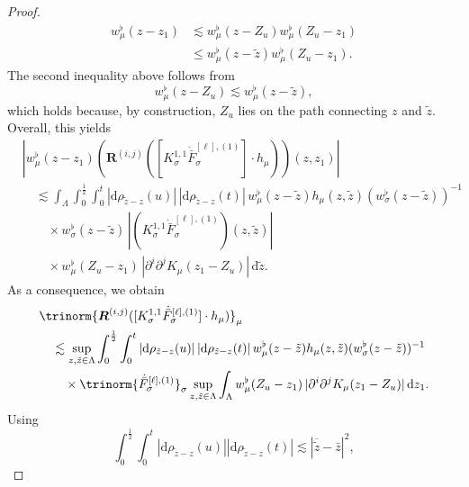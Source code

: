 \documentclass{article}
\numberwithin{equation}{section}
\newcommand{\mathd}{\mathrm{d}}
\theoremstyle{plain}
\theoremstyle{definition}
\begin{document}
\begin{proof}
\begin{align*}
  	w^{\flat}_{\mu} (z - z_1)
  	&\lesssim w^{\flat}_{\mu} (z - Z_u)
  	w^{\flat}_{\mu} (Z_u - z_1)\\
  	&\leqslant w^{\flat}_{\mu} (z - \tilde z)
  	w^{\flat}_{\mu} (Z_u - z_1).
  \end{align*}
  The second inequality above follows from
  \[ w^{\flat}_{\mu} (z - Z_u) \lesssim w^{\flat}_{\mu} (z -
     \tilde{z}), \]
  which holds because, by construction, $Z_u$ lies on the path
  connecting $z$ and $\tilde{z}$. Overall, this yields
  \begin{align*}
    &| w_{\mu}^{\flat} (z - z_1)
    (\boldsymbol{R}^{(i, j)} ([K^{1, 1}_{\sigma}
    \dot{\bar{F}}_{\sigma}^{[\ell], (1)}] \cdot h_{\mu})) (z, z_1) |\\
    &\quad \lesssim \int_{\Lambda} \int_0^{\frac{1}{2}} \int_0^t
    | \mathd \rho _{\tilde{z} - z} (u) |\,
    | \mathd \rho _{\tilde{z} - z} (t) |\,
    w_{\mu}^{\flat} (z - \tilde{z}) h_{\mu} (z, \tilde{z})
    (w_{\sigma}^{\flat} (z - \tilde{z}))^{- 1}\\
    &\qquad \times w_{\sigma}^{\flat} (z - \tilde{z})
    \,| (K^{1, 1}_{\sigma}
    \dot{\bar{F}}_{\sigma}^{[\ell], (1)}) (z, \tilde{z}) |\\
    &\qquad \times
    w^{\flat}_{\mu} (Z_u - z_1)
    \,| \partial^i \partial^j K_{\mu}
    (z_1 - Z_u) |\,\mathd \tilde{z} .
  \end{align*}
  As a consequence, we obtain
  \begin{align*}
    &\trinorm{ \boldsymbol{R}^{(i, j)} ([K^{1, 1}_{\sigma}
    \dot{\bar{F}}_{\sigma}^{[\ell], (1)}] \cdot h_{\mu})
    }_{\mu}\\
    &\quad \lesssim
    \sup_{z, \tilde{z} \in \Lambda}
    \int_0^{\frac{1}{2}} \int_0^t
    | \mathd \rho _{\tilde{z} - z} (u) |\,
    | \mathd \rho _{\tilde{z} - z} (t) |\,
    w_{\mu}^{\flat} (z - \tilde{z}) h_{\mu} (z, \tilde{z})
    (w_{\sigma}^{\flat} (z - \tilde{z}))^{- 1}\\
    &\qquad \times
    \trinorm{ \dot{\bar{F}}_{\sigma}^{[\ell], (1)}
    }_{\sigma}
    \sup_{z, \tilde{z} \in \Lambda} \int_{\Lambda}
    w^{\flat}_{\mu} (Z_u - z_1)\,
    | \partial^i \partial^j K_{\mu}
    (z_1 - Z_u) |\, \mathd z_1 .
  \end{align*}
  Using
  \begin{equation}
    \int_0^{\frac{1}{2}} \int_0^t  | \mathd \rho _{\tilde{z} - z} (u) |  |
    \mathd \rho _{\tilde{z} - z} (t) | \lesssim | \overline{\tilde{z}} -
    \bar{z} |^2, \label{eq:bounded-total-mass}
  \end{equation}

\end{proof}
\end{document}
